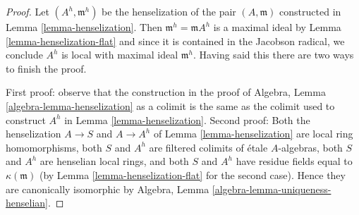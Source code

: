 \documentclass[10pt,a4paper]{amsart}
\theoremstyle{plain}
\theoremstyle{definition}
\theoremstyle{remark}
\numberwithin{equation}{subsection}
\begin{document}
\begin{proof}
Let $(A^h, \mathfrak m^h)$ be the henselization of the pair $(A, \mathfrak m)$
constructed in Lemma \ref{lemma-henselization}. Then
$\mathfrak m^h = \mathfrak m A^h$ is a maximal ideal
by Lemma \ref{lemma-henselization-flat} and since it
is contained in the Jacobson radical, we conclude $A^h$ is
local with maximal ideal $\mathfrak m^h$. Having said this
there are two ways to finish the proof.

\medskip\noindent
First proof: observe that the construction in the proof of
Algebra, Lemma \ref{algebra-lemma-henselization} as a colimit
is the same as the colimit used to construct $A^h$ in
Lemma \ref{lemma-henselization}.
Second proof: Both the henselization $A \to S$ and $A \to A^h$ of
Lemma \ref{lemma-henselization} are local ring homomorphisms,
both $S$ and $A^h$ are filtered colimits of \'etale $A$-algebras,
both $S$ and $A^h$ are henselian local rings, and both $S$ and $A^h$
have residue fields equal to $\kappa(\mathfrak m)$ (by
Lemma \ref{lemma-henselization-flat} for the second case).
Hence they are canonically isomorphic by
Algebra, Lemma \ref{algebra-lemma-uniqueness-henselian}.
\end{proof}
\end{document}
